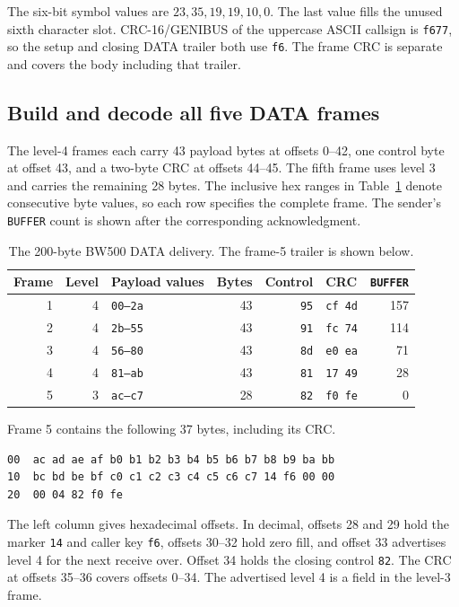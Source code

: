The six-bit symbol values are $23,35,19,19,10,0$. The last value fills the
unused sixth character slot. CRC-16/GENIBUS of the uppercase ASCII callsign
is \texttt{f677}, so the setup and closing DATA trailer both use \texttt{f6}.
The frame CRC is separate and covers the body including that trailer.

\subsection{Build and decode all five DATA frames}

The level-4 frames each carry 43 payload bytes at offsets 0--42, one control
byte at offset 43, and a two-byte CRC at offsets 44--45. The fifth frame
uses level 3 and carries the remaining 28 bytes. The inclusive hex ranges
in Table~\ref{tab:worked-bw500-data} denote consecutive byte values, so each
row specifies the complete frame. The sender's \texttt{BUFFER} count is
shown after the corresponding acknowledgment.

\begin{table}[htbp]
\centering\small
\begin{tabular}{@{}rrlrrlr@{}}
\toprule
Frame & Level & Payload values & Bytes & Control & CRC & \texttt{BUFFER} \\
\midrule
1 & 4 & \texttt{00--2a} & 43 & \texttt{95} & \texttt{cf 4d} & 157 \\
2 & 4 & \texttt{2b--55} & 43 & \texttt{91} & \texttt{fc 74} & 114 \\
3 & 4 & \texttt{56--80} & 43 & \texttt{8d} & \texttt{e0 ea} & 71 \\
4 & 4 & \texttt{81--ab} & 43 & \texttt{81} & \texttt{17 49} & 28 \\
5 & 3 & \texttt{ac--c7} & 28 & \texttt{82} & \texttt{f0 fe} & 0 \\
\bottomrule
\end{tabular}
\caption{The 200-byte BW500 DATA delivery. The frame-5 trailer is shown below.}
\label{tab:worked-bw500-data}
\end{table}

Frame 5 contains the following 37 bytes, including its CRC.
\begin{verbatim}
00  ac ad ae af b0 b1 b2 b3 b4 b5 b6 b7 b8 b9 ba bb
10  bc bd be bf c0 c1 c2 c3 c4 c5 c6 c7 14 f6 00 00
20  00 04 82 f0 fe
\end{verbatim}
The left column gives hexadecimal offsets. In decimal, offsets 28 and 29
hold the marker \texttt{14} and caller key \texttt{f6}, offsets 30--32 hold
zero fill, and offset 33 advertises level 4 for the next receive over.
Offset 34 holds the closing control \texttt{82}. The CRC at offsets 35--36
covers offsets 0--34. The advertised level 4 is a field in the level-3 frame.

